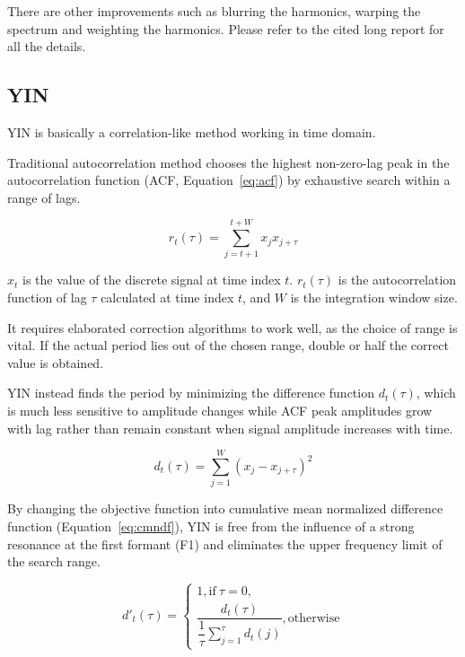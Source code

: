 \documentclass[11pt,a4paper]{report}
\begin{document}
There are other improvements such as blurring the harmonics, warping the spectrum and weighting the harmonics.
Please refer to the cited long report for all the details.

\subsection{YIN}

YIN is basically a correlation-like method working in time domain.

Traditional autocorrelation method chooses the highest non-zero-lag peak in the autocorrelation function (ACF, Equation~\ref{eq:acf}) by exhaustive search within a range of lags.

\begin{equation} \label{eq:acf}
  r_t (\tau) = \sum_{j=t+1}^{t+W} x_j x_{j+\tau}
\end{equation}

\(x_t\) is the value of the discrete signal at time index \(t\).
\(r_t (\tau)\) is the autocorrelation function of lag \(\tau\) calculated at time index \(t\), and \(W\) is the integration window size.

It requires elaborated correction algorithms to work well, as the choice of range is vital.
If the actual period lies out of the chosen range, double or half the correct value is obtained.

YIN instead finds the period by minimizing the difference function \(d_t (\tau)\), which is much less sensitive to amplitude changes while ACF peak amplitudes grow with lag rather than remain constant when signal amplitude increases with time.

\begin{equation}
  d_t (\tau) = \sum_{j=1}^W (x_j - x_{j+\tau})^2
\end{equation}

By changing the objective function into cumulative mean normalized difference function (Equation~\ref{eq:cmndf}), YIN is free from the influence of a strong resonance at the first formant (F1) and eliminates the upper frequency limit of the search range.

\begin{equation} \label{eq:cmndf}
d'_t (\tau) = \begin{cases}
1, \text{if}\ \tau = 0, \\
\dfrac{d_t (\tau)}{\dfrac{1}{\tau} \sum_{j=1}^{\tau} d_t (j)}, \text{otherwise}
\end{cases}
\end{equation}
\end{document}
